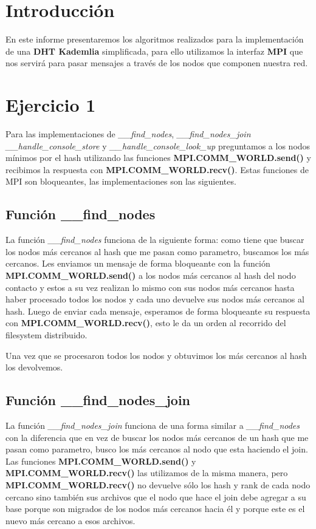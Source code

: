 \section{Introducción}
En este informe presentaremos los algoritmos realizados para la implementación de una \textbf{DHT Kademlia} simplificada, para ello utilizamos la interfaz \textbf{MPI} que nos servirá para pasar mensajes a través de los nodos que componen nuestra red.

\section{Ejercicio 1}
Para las implementaciones de \emph{\_\_find\_nodes}, \emph{\_\_find\_nodes\_join} \emph{\_\_handle\_console\_store} y \emph{\_\_handle\_console\_look\_up} preguntamos a los nodos mínimos por el hash utilizando las funciones \textbf{MPI.COMM\_WORLD.send()} y recibimos la respuesta con \textbf{MPI.COMM\_WORLD.recv()}. Estas funciones de MPI son bloqueantes, las implementaciones son las siguientes.

\subsection{Función \_\_find\_nodes}
La función \emph{\_\_find\_nodes} funciona de la siguiente forma: como tiene que buscar los nodos más cercanos al hash que me pasan como parametro, buscamos los más cercanos. Les enviamos un mensaje de forma bloqueante con la función \textbf{MPI.COMM\_WORLD.send()} a los nodos más cercanos al hash del nodo contacto y estos a su vez realizan lo mismo con sus nodos más cercanos hasta haber procesado todos los nodos y cada uno devuelve sus nodos más cercanos al hash. Luego de enviar cada mensaje, esperamos de forma bloqueante su respuesta con \textbf{MPI.COMM\_WORLD.recv()}, esto le da un orden al recorrido del filesystem distribuido.

Una vez que se procesaron todos los nodos y obtuvimos los más cercanos al hash los devolvemos.


\subsection{Función \_\_find\_nodes\_join}
La función \emph{\_\_find\_nodes\_join} funciona de una forma similar a \emph{\_\_find\_nodes} con la diferencia que en vez de buscar los nodos más cercanos de un hash que me pasan como parametro, busco los más cercanos al nodo que esta haciendo el join. Las funciones \textbf{MPI.COMM\_WORLD.send()} y \textbf{MPI.COMM\_WORLD.recv()} las utilizamos de la misma manera, pero \textbf{MPI.COMM\_WORLD.recv()} no devuelve sólo los hash y rank de cada nodo cercano sino también sus archivos que el nodo que hace el join debe agregar a su base porque son migrados de los nodos más cercanos hacia él y porque este es el nuevo más cercano a esos archivos.

